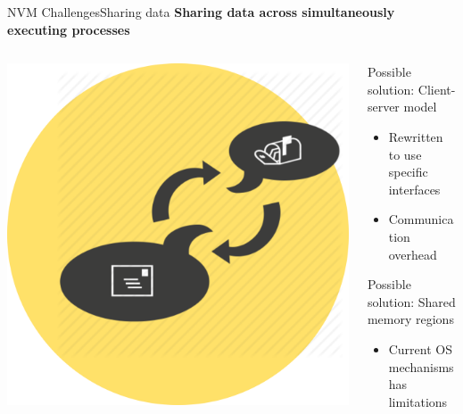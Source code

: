 \documentclass[10pt]{beamer}
\begin{document}
\begin{frame}{NVM Challenges}{Sharing data}
  \textbf{Sharing data across simultaneously executing processes}

  \begin{columns}[T]
    \begin{column}{.2\textwidth}
      \includegraphics[width=1.7\textwidth, keepaspectratio=true]{images/client_server.png}
    \end{column} \pause

    \hfill
    \begin{column}{.7\textwidth}
      Possible solution: Client-server model \pause
      \begin{itemize}
        \item Rewritten to use specific interfaces \pause
        \item Communication overhead \pause
      \end{itemize}
      Possible solution: Shared memory regions \pause
      \begin{itemize}
        \item Current OS mechanisms has limitations
      \end{itemize}
    \end{column}

  \end{columns}
\end{frame}
\end{document}
